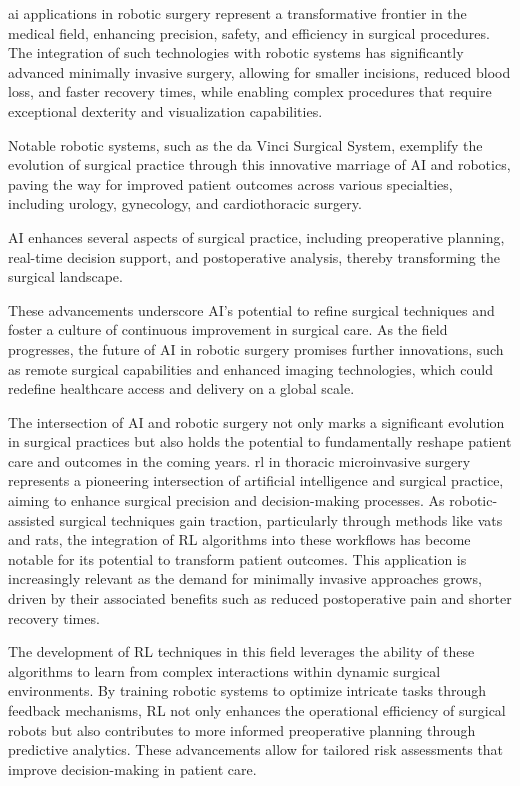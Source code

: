 \documentclass[a4paper,11pt]{report}
\theoremstyle{definition}
\theoremstyle{plain}
\theoremstyle{remark}  %
\begin{document}
\gls{ai} applications in robotic surgery represent a transformative frontier in the medical field, 
enhancing precision, safety, and efficiency in surgical procedures. 
The integration of such technologies with robotic systems has significantly advanced minimally 
invasive surgery, allowing for smaller incisions, reduced blood loss, and faster recovery times, 
while enabling complex procedures that require exceptional dexterity and visualization capabilities.

Notable robotic systems, such as the da Vinci Surgical System, exemplify the evolution of surgical 
practice through this innovative marriage of AI and robotics, paving the way for improved 
patient outcomes across various specialties, including urology, gynecology, and cardiothoracic surgery.

AI enhances several aspects of surgical practice, including preoperative planning, 
real-time decision support, and postoperative analysis, thereby transforming the surgical landscape.

These advancements underscore AI's potential to refine surgical techniques and foster a culture 
of continuous improvement in surgical care. As the field progresses, the future of AI in robotic 
surgery promises further innovations, such as remote surgical capabilities and enhanced imaging 
technologies, which could redefine healthcare access and delivery on a global scale.



The intersection of AI and robotic surgery not only marks a significant evolution in surgical practices but also holds the potential to fundamentally reshape patient care and outcomes in the coming years.
\gls{rl} in thoracic microinvasive surgery represents a pioneering intersection of artificial intelligence 
and surgical practice, aiming to enhance surgical precision and decision-making processes. 
As robotic-assisted surgical techniques gain traction, particularly through methods like 
\gls{vats} and \gls{rats}, 
the integration of RL algorithms into these workflows has become notable for its potential to 
transform patient outcomes. This application is increasingly relevant as the demand for minimally 
invasive approaches grows, driven by their associated benefits such as reduced postoperative pain 
and shorter recovery times.

The development of RL techniques in this field leverages the ability of these algorithms to learn 
from complex interactions within dynamic surgical environments. By training robotic systems to 
optimize intricate tasks through feedback mechanisms, RL not only enhances the operational efficiency 
of surgical robots but also contributes to more informed preoperative planning through predictive 
analytics. 
These advancements allow for tailored risk assessments that improve decision-making in patient care.
\end{document}
